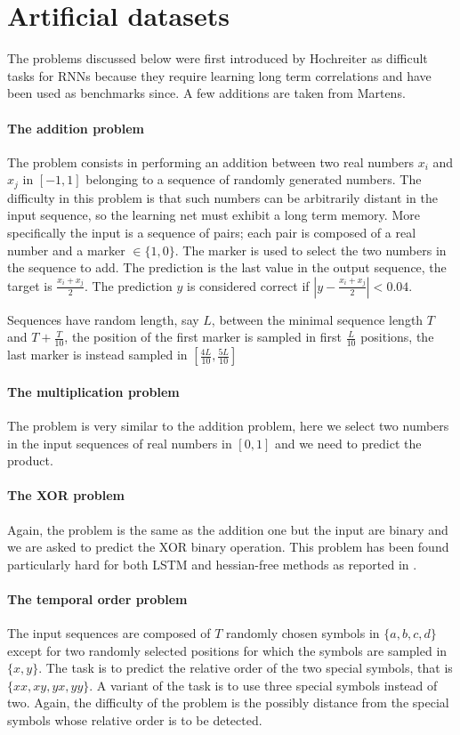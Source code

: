 \section{Artificial datasets}

The problems discussed below were first introduced by Hochreiter \cite{lstm} as difficult tasks for RNNs because they require learning long term correlations and have been used as benchmarks since. A few additions are taken from Martens\cite{hessianFree}.

\paragraph{The addition problem}
The problem consists in performing an addition between two real numbers $x_i$ and $x_j$ in $[-1,1]$ belonging to a sequence of randomly generated numbers. The difficulty in this problem is that such numbers can be arbitrarily
distant in the input sequence, so the learning net must exhibit a long term memory. More specifically the input is a sequence of pairs; each pair is composed of a real number and a marker $\in\{1,0\}$. The marker is used to select the two numbers in the sequence to add. The prediction is the last value in the output sequence, the target is $\frac{x_i+x_j}{2}$. The prediction $y$ is considered correct
if $|y-\frac{x_i+x_j}{2}| < 0.04$.

Sequences have random length, say $L$, between the minimal sequence length $T$ and $T+\frac{T}{10}$, the position of the first marker is sampled in first $\frac{L}{10}$ positions, the last marker is
instead sampled in $[\frac{4L}{10},\frac{5L}{10}]$

\paragraph{The multiplication problem}
The problem is very similar to the addition problem, here we select two numbers in the input sequences of real numbers in $[0,1]$ and we need to predict the product.

\paragraph{The XOR problem}
Again, the problem is the same as the addition one but the input are binary and we are asked to predict the XOR binary operation. This problem has been found particularly hard for both LSTM and hessian-free methods as reported in \cite{hessianFree}.

\paragraph{The temporal order problem}
The input sequences are composed of $T$ randomly chosen symbols in $\{a,b,c,d\}$ except for two randomly selected positions for which the symbols are sampled in $\{x,y\}$.
The task is to predict the relative order of the two special symbols, that is $\{xx,xy,yx,yy\}$. A variant of the task is to use three special symbols instead of two.
Again, the difficulty of the problem is the possibly distance from the special symbols whose relative order is to be detected. 
